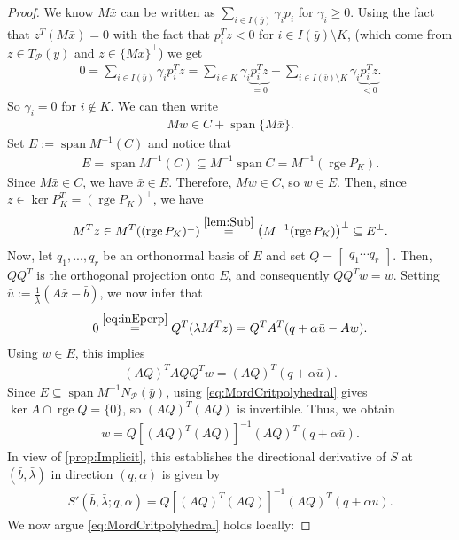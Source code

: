 \documentclass[reqno]{amsart}
\numberwithin{equation}{section}
\newcommand{\pol}{\mathcal{P}}
\newcommand{\x}{\bar{x}}
\newcommand{\rge}{\operatorname{rge}}
\begin{document}
\begin{proof}
We know $M\bar{x}$ can be written as $\sum_{i \in I(\bar{y})} \gamma_i p_i$ for $\gamma_i \ge 0$.
Using the fact that $z^T(M\x) = 0$ with the fact that $p_i^Tz < 0$ for $i \in I(\bar{y}) \setminus K$, (which come from $z \in T_{\pol}(\bar{y})$ and $z \in \{M \x\}^{\bot}$) we get
\begin{align*}
    0 = \sum\limits_{i \in I(\bar{y})} \gamma_i p_i^Tz = \sum\limits_{i \in K} \gamma_i \underbrace{p_i^Tz}_{ = 0} + \sum\limits_{i \in I(\bar{v}) \setminus K} \gamma_i \underbrace{p_i^Tz}_{< 0}.
\end{align*} So $\gamma_i = 0$ for $i \not \in K$. We can then write
\begin{align*}
    Mw \in C + \operatorname{span}\{M\bar{x}\}.
\end{align*}
    Set $E := \operatorname{span} M^{-1}(C)$ and notice that \begin{align*}
        E =\operatorname{span} M^{-1}(C) \subseteq M^{-1} \operatorname{span} C = M^{-1} (\rge P_{K}).
    \end{align*}  Since $M \x \in C$, we have $\x \in E$. Therefore, $Mw \in C$, so $w \in E$.
    Then, since $z \in \ker P_K^T = (\rge P_K)^{\bot}$, we have
    \begin{align}\label{eq:inEperp}
        M^Tz \in M^T ((\rge P_K)^{\bot}) \overset{\eqref{lem:Sub}}{=} \left(M^{-1}(\rge P_K)\right)^{\bot} \subseteq E^{\bot}.
    \end{align}
    Now, let $q_1,...,q_r$ be an orthonormal basis of $E$
    and set $Q = \begin{bmatrix}
        q_1 \cdots q_r
    \end{bmatrix}$. Then, $QQ^T$ is the orthogonal projection onto $E$, and consequently $QQ^Tw = w$.
    Setting $\bar{u} := \frac{1}{\bar{\lambda}} (A \x - \bar{b})$, we now infer that \begin{align*}
        0 \overset{\eqref{eq:inEperp}}{=} Q^T (\lambda M^Tz) = Q^T A^T (q + \alpha \bar{u} - Aw).
    \end{align*} Using $w \in E$, this implies \begin{align*}
        (AQ)^T AQQ^Tw = (AQ)^T(q + \alpha \bar{u}).
    \end{align*} Since $E \subseteq \operatorname{span} M^{-1} N_{\pol}(\bar{y})$, using \eqref{eq:MordCritpolyhedral} gives
    $\ker A \cap \rge Q = \{0\}$, so $(AQ)^T(AQ)$ is invertible.
    Thus, we obtain \begin{align*}
        w = Q[(AQ)^T(AQ)]^{-1} (AQ)^T (q + \alpha \bar{u}).
    \end{align*} In view of \eqref{prop:Implicit}, this establishes the directional derivative of $S$ at $(\bar{b}, \bar{\lambda})$ in direction $(q, \alpha)$ is given by
    \begin{align*}
        S'(\bar{b}, \bar{\lambda} ; q, \alpha) = Q[(AQ)^T(AQ)]^{-1} (AQ)^T (q + \alpha \bar{u}).
    \end{align*}
    We now argue \eqref{eq:MordCritpolyhedral} holds locally:


\end{proof}
\end{document}
